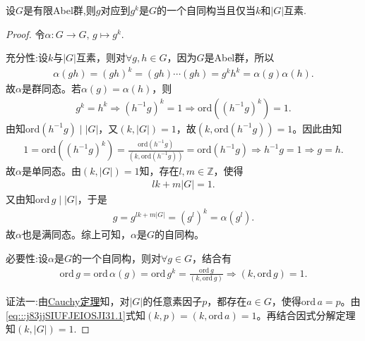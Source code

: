 \documentclass[../../main.tex]{subfiles}%
\begin{document}
\begin{proposition}\label{proposition:g到g的幂的自同构充要条件}
设$G$是有限Abel群,则$g$对应到$g^k$是$G$的一个自同构当且仅当$k$和$|G|$互素.
\end{proposition}
\begin{proof}

令$\alpha: G\to G,\, g\mapsto g^k.$

{\heiti 充分性:}设$k$与$|G|$互素，则对$\forall g,h\in G$，因为$G$是Abel群，所以
\begin{align*}
\alpha(gh)=(gh)^k=(gh)\cdots(gh)=g^kh^k=\alpha(g)\alpha(h).
\end{align*}
故$\alpha$是群同态。若$\alpha(g)=\alpha(h)$，则
\begin{align*}
g^k=h^k\Longrightarrow (h^{-1}g)^k=1\Longrightarrow \mathrm{ord}\left((h^{-1}g)^k\right)=1.
\end{align*}
由知$\mathrm{ord}(h^{-1}g)\mid |G|$，又$(k,|G|)=1$，故$(k,\mathrm{ord}(h^{-1}g))=1$。因此由知
\begin{align*}
1=\mathrm{ord}\left((h^{-1}g)^k\right)=\frac{\mathrm{ord}(h^{-1}g)}{(k,\mathrm{ord}(h^{-1}g))}=\mathrm{ord}(h^{-1}g)\Longrightarrow h^{-1}g=1\Longrightarrow g=h.
\end{align*}
故$\alpha$是单同态。由$(k,|G|)=1$知，存在$l,m\in\mathbb{Z}$，使得
\begin{align*}
lk+m|G|=1.
\end{align*}
又由知$\mathrm{ord}\,g\mid |G|$，于是
\begin{align*}
g=g^{lk+m|G|}=(g^l)^k=\alpha(g^l).
\end{align*}
故$\alpha$也是满同态。综上可知，$\alpha$是$G$的自同构。

{\heiti 必要性:}设$\alpha$是$G$的一个自同构，则对$\forall g\in G$，结合有
\begin{align}
\mathrm{ord}\,g=\mathrm{ord}\,\alpha(g)=\mathrm{ord}\,g^k=\frac{\mathrm{ord}\,g}{(k,\mathrm{ord}\,g)}\Longrightarrow (k,\mathrm{ord}\,g)=1.
\label{eq:::j83jjSIUFJEIOSJI31.1}
\end{align}

{\color{blue}证法一:}由\hyperref[theorem:抽象代数--Cauchy定理]{Cauchy定理}知，对$|G|$的任意素因子$p$，都存在$a\in G$，使得$\mathrm{ord}\,a=p$。由\eqref{eq:::j83jjSIUFJEIOSJI31.1}式知$(k,p)=(k,\mathrm{ord}\,a)=1$。再结合因式分解定理知$(k,|G|)=1$.


\end{proof}
\end{document}
